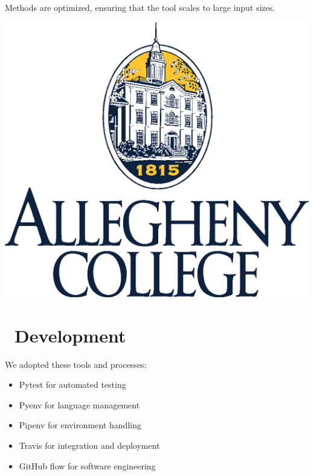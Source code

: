 \documentclass[a0paper,fleqn]{betterposter}
\begin{document}
{  \vspace*{.25in}
  Methods are optimized, ensuring that the tool scales to large input sizes.
  \vspace*{.5in}

  \vfill

  \includegraphics[width=\textwidth]{img/CollegeLogo.eps}\\

  }{


  \vspace*{-.5in}
  \section{\faCodeFork~Development}
  We adopted these tools and processes:\\
  \vspace*{-.5in}
  \begin{itemize}[leftmargin=*]

    \item{Pytest for automated testing}
    \item{Pyenv for language management}
    \item{Pipenv for environment handling}
    \item{Travis for integration and deployment}
    \item{GitHub flow for software engineering}


\end{itemize}}
\end{document}
